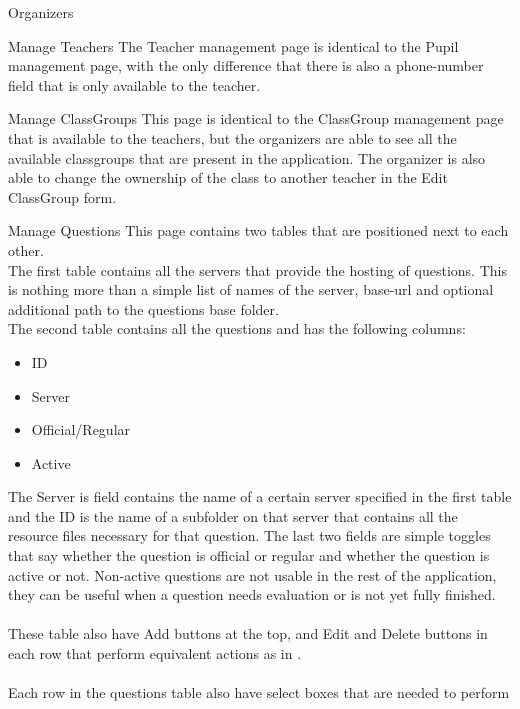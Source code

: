 \begin{section}{Organizers}
	\begin{subsection}{Manage Teachers}
		The Teacher management page is identical to the Pupil management page, with the
		only difference that there is also a phone-number field that is only available
		to the teacher.
	\end{subsection}
	
	\begin{subsection}{Manage ClassGroups}
		This page is identical to the ClassGroup management page that is available to the
		teachers, but the organizers are able to see all the available classgroups that
		are present in the application. The organizer is also able to change the ownership
		of the class to another teacher in the Edit ClassGroup form.
	\end{subsection}
	
	\begin{subsection}{Manage Questions}
		This page contains two tables that are positioned next to each other. \\
		The first table contains all the servers that provide the hosting of questions.
		This is nothing more than a simple list of names of the server, base-url and
		optional additional path to the questions base folder. \\
		The second table contains all the questions and has the following columns:
		\begin{itemize}
			\item ID
			\item Server
			\item Official/Regular
			\item Active
		\end{itemize}
		The Server is field contains the name of a certain server specified in the first
		table and the ID is the name of a subfolder on that server that contains all the
		resource files necessary for that question.
		The last two fields are simple toggles that say whether the question is official
		or regular and whether the question is active or not. Non-active questions are
		not usable in the rest of the application, they can be useful when a question
		needs evaluation or is not yet fully finished. \\
		\\
		These table also have Add buttons at the top, and Edit and Delete buttons in each
		row that perform equivalent actions as in .
		\\
		\\
		Each row in the questions table also have select boxes that are needed to perform

\end{subsection}
\end{section}
